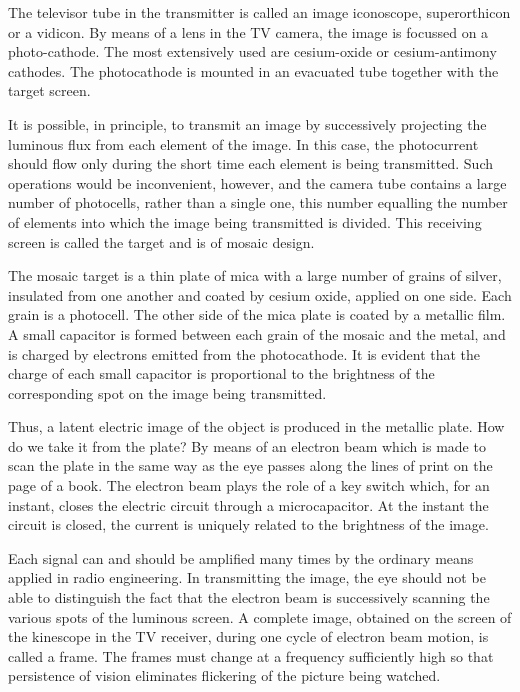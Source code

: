The televisor tube in the transmitter is called an image iconoscope, superorthicon or a vidicon. By means of a lens in the TV camera, the image is focussed on a photo-cathode. The most extensively used are cesium-oxide or cesium-antimony cathodes. The photocathode is mounted in an evacuated tube together with the target screen.

It is possible, in principle, to transmit an image by successively projecting the luminous flux from each element of the image. In this case, the photocurrent should flow only during the short time each element is being transmitted. Such operations would be inconvenient, however, and the camera tube contains a large number of photocells, rather than a single one, this number equalling the number of elements into which the image being transmitted is divided. This receiving screen is called the target and is of mosaic design.

The mosaic target is a thin plate of mica with a large number of grains of silver, insulated from one another and coated by cesium oxide, applied on one side. Each grain is a photocell. The other side of the mica plate is coated by a metallic film. A small capacitor is formed between each grain of the mosaic and the metal, and is charged by electrons emitted from the photocathode. It is evident that the charge of each small capacitor is proportional to the brightness of the corresponding spot on the image being transmitted.

Thus, a latent electric image of the object is produced in the metallic plate. How do we take it from the plate? By means of an electron beam which is made to scan the plate in the same way as the eye passes along the lines of print on the page of a book. The electron beam plays the role of a key switch which, for an instant, closes the electric circuit through a microcapacitor. At the instant the circuit is closed, the current is uniquely related to the brightness of the image.

Each signal can and should be amplified many times by the ordinary means applied in radio engineering. In transmitting the image, the eye should not be able to distinguish the fact that the electron beam is successively scanning the various spots of the luminous screen. A complete image, obtained on the screen of the kinescope in the TV receiver, during one cycle of electron beam motion, is called a frame. The frames must change at a frequency sufficiently high so that persistence of vision eliminates flickering of the picture being watched. 

